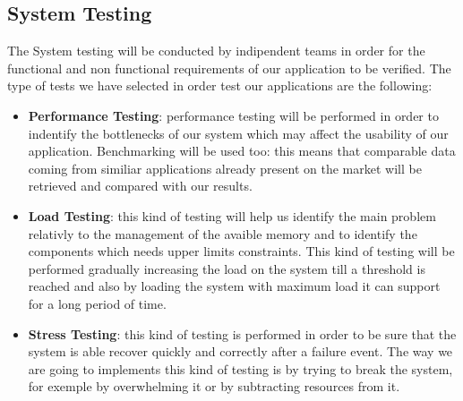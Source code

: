 \subsection{System Testing}
The System testing will be conducted by indipendent teams in order for the functional and non functional requirements of our application to be verified.
The type of tests we have selected in order test our applications are the following:
\begin{itemize}
    \item \textbf{Performance Testing}: performance testing will be performed in order to indentify the bottlenecks of our system which may affect the usability of our application. Benchmarking will be used too: this means that comparable data coming from similiar applications already present on the market will be retrieved and compared with our results.
    \item \textbf{Load Testing}: this kind of testing will help us identify the main problem relativly to the management of the avaible memory and to identify the components which needs upper limits constraints. This kind of testing will be performed gradually increasing the load on the system till a threshold is reached and also by loading the system with maximum load it can support for a long period of time.
    \item \textbf{Stress Testing}: this kind of testing is performed in order to be sure that the system is able recover quickly and correctly after a failure event. The way we are going to implements this kind of testing is by trying to break the system, for exemple by overwhelming it or by subtracting resources from it.
\end{itemize}








